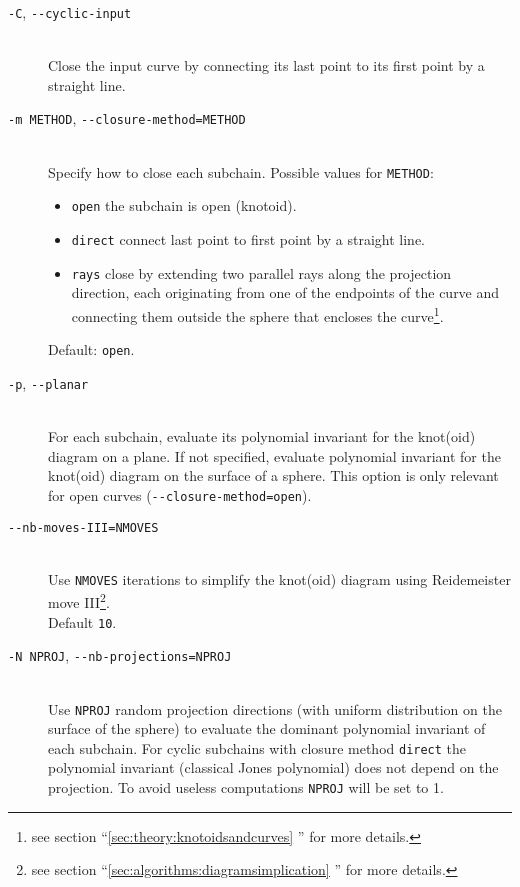 \begin{description}
\item[\lstinline{-C}, \lstinline{--cyclic-input}]\hfill\\
  Close the input curve by connecting its last point to its first point by a straight line.  
\item[\lstinline{-m METHOD}, \lstinline{--closure-method=METHOD}]\hfill\\
  Specify how to close each subchain. Possible values for \lstinline{METHOD}:
  \begin{itemize}
  \item \lstinline{open} the subchain is open (knotoid).
  \item \lstinline{direct} connect last point to first point by a straight line.
  \item \lstinline{rays} close by extending two parallel rays along the projection direction, each originating from one of the endpoints of the curve and connecting them outside the sphere that encloses the curve\footnote{see section ``\ref{sec:theory:knotoidsandcurves} '' for more details.}.
  \end{itemize}
  Default: \lstinline{open}.
\item[\lstinline{-p}, \lstinline{--planar}]\hfill\\
  For each subchain, evaluate its polynomial invariant for the knot(oid) diagram on a plane. If not specified, evaluate polynomial invariant for the knot(oid) diagram on the surface of a sphere. This option is only relevant for open curves (\lstinline{--closure-method=open}).
\item[\lstinline{--nb-moves-III=NMOVES}]\hfill\\
  Use \lstinline{NMOVES} iterations to simplify the knot(oid) diagram using Reidemeister move III\footnote{see section  ``\ref{sec:algorithms:diagramsimplication} '' for more details.}.\\
  Default \lstinline{10}.
\item[\lstinline{-N NPROJ}, \lstinline{--nb-projections=NPROJ}]\hfill\\
  Use \lstinline{NPROJ} random projection directions (with uniform distribution on the surface of the sphere) to evaluate the dominant polynomial invariant of each subchain.  For cyclic subchains with closure method \lstinline{direct} the polynomial invariant (classical Jones polynomial) does not depend on the projection. To avoid useless computations \lstinline{NPROJ} will be set to 1.\\

\end{description}
